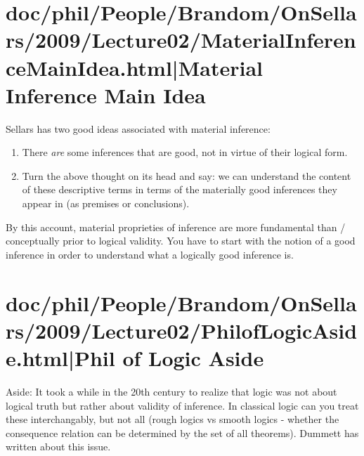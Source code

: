 \documentclass[12pt,a4paper]{report}
\begin{document}
\part{doc/phil/People/Brandom/OnSellars/2009/Lecture02/MaterialInferenceMainIdea.html|Material Inference Main Idea}

Sellars has two good ideas associated with material inference:
\begin{enumerate}
\item There \emph{are} some inferences that are good, not in virtue of their logical form.
\item Turn the above thought on its head and say: we can understand the content of these descriptive terms in terms of the materially good inferences they appear in (as premises or conclusions).
\end{enumerate}


By this account, material proprieties of inference are more fundamental than / conceptually prior to logical validity. You have to start with the notion of a good inference in order to understand what a logically good inference is.

\part{doc/phil/People/Brandom/OnSellars/2009/Lecture02/PhilofLogicAside.html|Phil of Logic Aside}

Aside: It took a while in the 20th century to realize that logic was not about
logical truth but rather about validity of inference. In classical logic can
you treat these interchangably, but not all (rough logics vs smooth logics -
whether the consequence relation can be determined by the set of all theorems).
Dummett has written about this issue.
\end{document}
